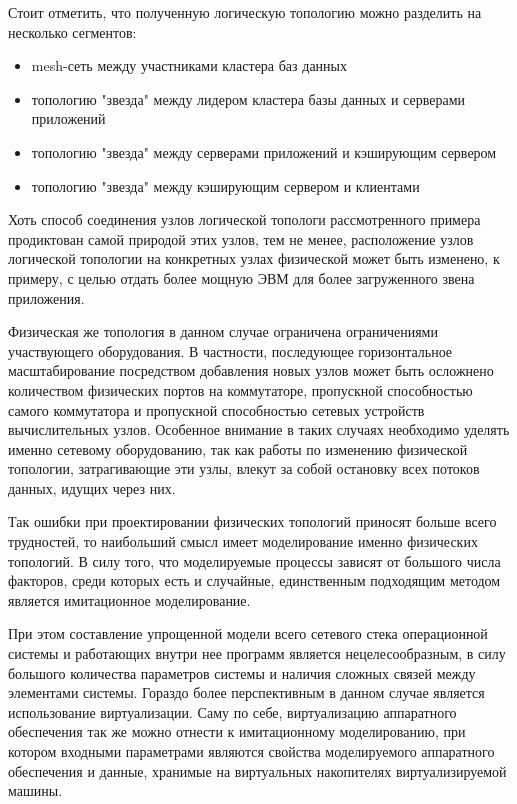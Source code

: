 Стоит отметить, что полученную логическую топологию можно разделить на несколько
сегментов:
\begin{itemize}
    \item mesh-сеть между участниками кластера баз данных
    \item топологию "звезда" между лидером кластера базы данных и серверами приложений
    \item топологию "звезда" между серверами приложений и кэширующим сервером
    \item топологию "звезда" между кэширующим сервером и клиентами
\end{itemize}

Хоть способ соединения узлов логической топологи рассмотренного примера продиктован 
самой природой этих узлов, тем не менее, расположение узлов логической топологии
на конкретных узлах физической может быть изменено, к примеру, с целью отдать более
мощную ЭВМ для более загруженного звена приложения.

Физическая же топология в данном случае ограничена ограничениями участвующего оборудования.
В частности, последующее горизонтальное масштабирование посредством добавления
новых узлов может быть осложнено количеством физических портов на коммутаторе, 
пропускной способностью самого коммутатора и пропускной способностью сетевых устройств
вычислительных узлов. Особенное внимание в таких случаях необходимо уделять именно
сетевому оборудованию, так как работы по изменению физической топологии, затрагивающие
эти узлы, влекут за собой остановку всех потоков данных, идущих через них.

Так ошибки при проектировании физических топологий приносят больше всего трудностей, 
то наибольший смысл имеет моделирование именно физических топологий.
В силу того, что моделируемые процессы зависят от большого числа факторов, 
среди которых есть и случайные, единственным подходящим методом является 
имитационное моделирование. \cite{shavenko}

При этом составление упрощенной модели всего сетевого стека операционной системы и 
работающих внутри нее программ является нецелесообразным, в силу большого количества
параметров системы и наличия сложных связей между элементами системы. Гораздо более
перспективным в данном случае является использование виртуализации. Саму по себе, 
виртуализацию аппаратного обеспечения так же можно отнести к имитационному моделированию,
при котором входными параметрами являются свойства моделируемого аппаратного обеспечения
и данные, хранимые на виртуальных накопителях виртуализируемой машины.

